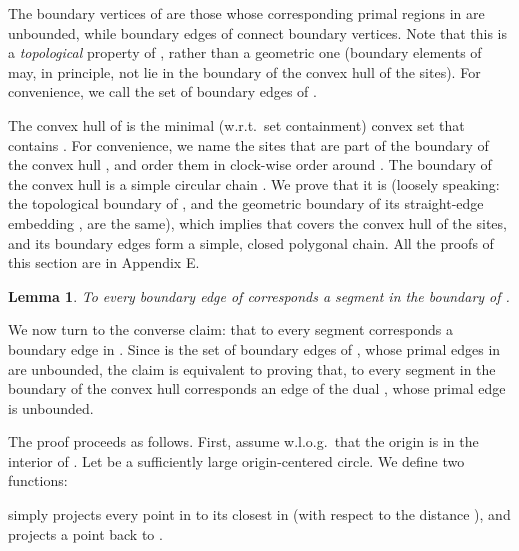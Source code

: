 \documentclass[11pt]{article}
\newtheorem{lemma}[theorem]{Lemma}
\begin{document}
The boundary vertices of  are those whose corresponding primal regions in  are unbounded, 
while boundary edges of  connect boundary vertices. 
Note that this is a \emph{topological} property of , rather than a geometric one (boundary elements of  may, in principle, not lie in the boundary of the convex hull of the sites). 
For convenience, we call  the set of boundary edges of . 




The convex hull  of  is the minimal (w.r.t.\ set
containment) convex set that contains . 
For convenience, we name  the sites that are part of the boundary of
the convex hull , and order them in clock-wise order around . 
The boundary  of the convex hull is a simple circular chain 
. We prove that it is  
(loosely speaking: the topological boundary of , and the geometric boundary of its straight-edge embedding , are the same), 
which implies that  covers
the convex hull of the sites, and its boundary edges form 
a simple, closed polygonal chain. All the proofs of this section are in Appendix E. 



















\begin{lemma}\label{boundary_easy}
To every boundary edge  of  corresponds a segment in the boundary of . \emph{}
\end{lemma}





We now turn to the converse claim: that to every segment 
 corresponds a boundary edge
 in . Since  is the set of boundary edges of , whose primal edges in
 are
unbounded, the claim is equivalent to proving that, to every segment
 in the boundary of the convex hull corresponds an edge of the
dual , whose primal edge  is unbounded. 


The proof proceeds as follows. First, assume w.l.o.g.\  that the origin is in the interior of . 
Let   be a sufficiently large origin-centered circle. 
We define two  functions: 

 simply projects every point in  to its closest in  (with respect to the distance ), 
and  projects a point back to . 
\end{document}
